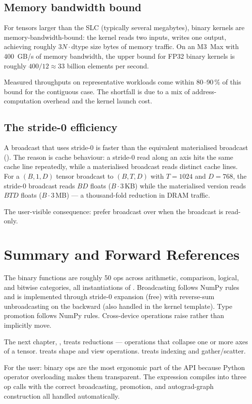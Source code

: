 \subsection{Memory bandwidth bound}
\label{ssec:binary_functions:bw_bound}

For tensors larger than the SLC (typically several megabytes),
binary kernels are memory-bandwidth-bound: the kernel reads two
inputs, writes one output, achieving roughly $3 N \cdot \text{dtype
size}$ bytes of memory traffic. On an M3~Max with 400~GB/s of
memory bandwidth, the upper bound for FP32 binary kernels is
roughly $400 / 12 \approx 33$ billion elements per second.

Measured throughputs on representative workloads come within
80--90\,\% of this bound for the contiguous case. The shortfall is
due to a mix of address-computation overhead and the kernel
launch cost.

\subsection{The stride-0 efficiency}
\label{ssec:binary_functions:stride0_eff}

A broadcast that uses stride-0 is faster than the equivalent
materialised broadcast (). The reason is cache
behaviour: a stride-0 read along an axis hits the same cache line
repeatedly, while a materialised broadcast reads distinct cache
lines. For a $(B, 1, D)$ tensor broadcast to $(B, T, D)$ with $T =
1024$ and $D = 768$, the stride-0 broadcast reads $B D$ floats
($B \cdot 3$\,KB) while the materialised version reads $B T D$
floats ($B \cdot 3$\,MB) --- a thousand-fold reduction in DRAM
traffic.

The user-visible consequence: prefer broadcast over 
when the broadcast is read-only.

\section{Summary and Forward References}
\label{sec:binary_functions:summary}

The binary functions are roughly 50 ops across arithmetic,
comparison, logical, and bitwise categories, all instantiations of
. Broadcasting follows NumPy rules and is
implemented through stride-0 expansion (free) with reverse-sum
unbroadcasting on the backward (also handled in the kernel
template). Type promotion follows NumPy rules. Cross-device
operations raise rather than implicitly move.

The next chapter, , treats reductions ---
operations that collapse one or more axes of a tensor.
 treats shape and view operations.
 treats indexing and gather/scatter.

\begin{lucidnote}
For the user: binary ops are the most ergonomic part of the API
because Python operator overloading makes them transparent. The
expression  compiles into three op calls with the
correct broadcasting, promotion, and autograd-graph construction
all handled automatically.
\end{lucidnote}
